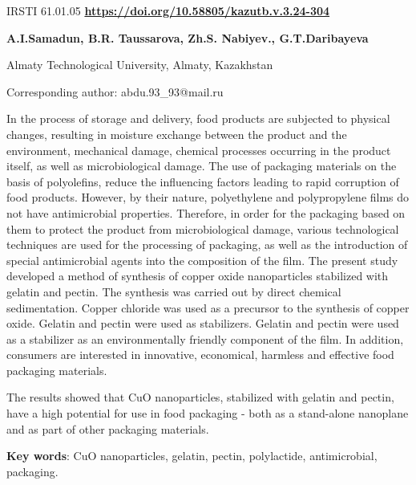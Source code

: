  \newpage
IRSTI 61.01.05
\hfill {\bfseries \href{https://doi.org/10.58805/kazutb.v.3.24-304}{https://doi.org/10.58805/kazutb.v.3.24-304}}


\begin{center}
{\bfseries A.I.Samadun, B.R. Taussarova, Zh.S. Nabiyev., G.T.Daribayeva}

Almaty Technological University, Almaty, Kazakhstan

Corresponding author: abdu.93\_93@mail.ru
\end{center}

In the process of storage and delivery, food products are subjected to
physical changes, resulting in moisture exchange between the product and
the environment, mechanical damage, chemical processes occurring in the
product itself, as well as microbiological damage. The use of packaging
materials on the basis of polyolefins, reduce the influencing factors
leading to rapid corruption of food products. However, by their nature,
polyethylene and polypropylene films do not have antimicrobial
properties. Therefore, in order for the packaging based on them to
protect the product from microbiological damage, various technological
techniques are used for the processing of packaging, as well as the
introduction of special antimicrobial agents into the composition of the
film. The present study developed a method of synthesis of copper oxide
nanoparticles stabilized with gelatin and pectin. The synthesis was
carried out by direct chemical sedimentation. Copper chloride was used
as a precursor to the synthesis of copper oxide. Gelatin and pectin were
used as stabilizers. Gelatin and pectin were used as a stabilizer as an
environmentally friendly component of the film. In addition, consumers
are interested in innovative, economical, harmless and effective food
packaging materials.

The results showed that CuO nanoparticles, stabilized with gelatin and
pectin, have a high potential for use in food packaging - both as a
stand-alone nanoplane and as part of other packaging materials.

{\bfseries Key words}: CuO nanoparticles, gelatin, pectin, polylactide,
antimicrobial, packaging.


